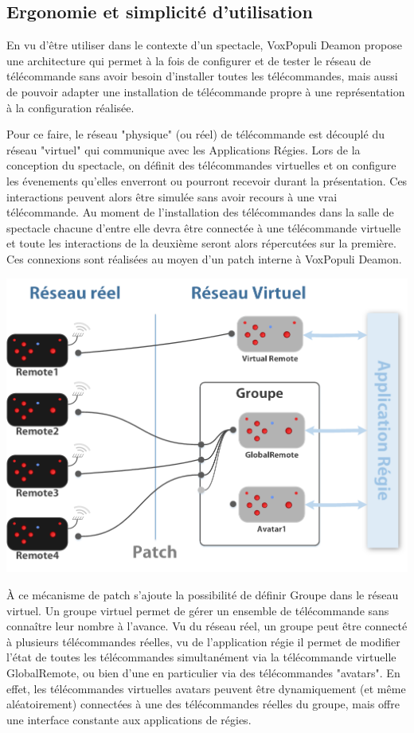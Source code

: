 \documentclass{Rapport}
\begin{document}
\subsection*{Ergonomie et simplicité d'utilisation}

En vu d'être utiliser dans le contexte d'un spectacle, VoxPopuli Deamon propose une architecture qui permet à la fois de configurer et de tester le réseau de télécommande sans avoir besoin d'installer toutes les télécommandes, mais aussi de pouvoir adapter une installation de télécommande propre à une représentation à la configuration réalisée.

Pour ce faire, le réseau "physique" (ou réel) de télécommande est découplé du réseau "virtuel" qui communique avec les Applications Régies. Lors de la conception du spectacle, on définit des télécommandes virtuelles et on configure les évenements qu'elles enverront ou pourront recevoir durant la présentation. Ces interactions peuvent alors être simulée sans avoir recours à une vrai télécommande. Au moment de l'installation des télécommandes dans la salle de spectacle chacune d'entre elle devra être connectée à une télécommande virtuelle et toute les interactions de la deuxième seront alors répercutées sur la première. Ces connexions sont réalisées au moyen d'un patch interne à VoxPopuli Deamon.

\includegraphics[width=0.8\columnwidth]{rsc/diaReseau}

À ce mécanisme de patch s'ajoute la possibilité de définir Groupe dans le réseau virtuel. Un groupe virtuel permet de gérer un ensemble de télécommande sans connaître leur nombre à l'avance. Vu du réseau réel, un groupe peut être connecté à plusieurs télécommandes réelles, vu de l'application régie il permet de modifier l'état de  toutes les télécommandes simultanément via la télécommande virtuelle GlobalRemote, ou bien d'une en particulier via des télécommandes "avatars". En effet, les télécommandes virtuelles avatars peuvent être dynamiquement (et même aléatoirement) connectées à une des télécommandes réelles du groupe, mais offre une interface constante aux applications de régies. 
\end{document}
